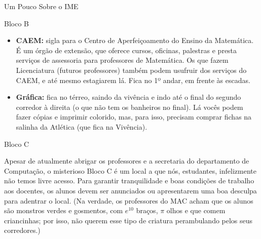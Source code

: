 \begin{secao}{Um Pouco Sobre o IME}
\begin{subsecao}{Bloco B}
\begin{itemize}
Neste ano, a Seção de Alunos nos informou
que o quadro de funcionários está bem reduzido, por isso, pedimos que:
\begin{itemize}
\item[-] Deem preferência ao uso do Sistema JupiterWeb (troquem conversas, ideias e informações com os colegas - um pode ajudar o outro)
\item[-] Evitem encaminhar mensagens por e-mail, pois devido a grande demanda de serviço, o retorno tem sido demorado.
\item[-] Evitem as ligações por telefone, pois a prioridade tem sido o andamento do serviço interno. 
\end{itemize}

\item {\bf CAEM:} sigla para o Centro de Aperfeiçoamento do Ensino da
  Matemática. É um órgão de extensão, que oferece cursos, oficinas, palestras e
  presta serviços de assessoria para professores de Matemática. Os que fazem
  Licenciatura (futuros professores) também podem usufruir dos serviços do CAEM,
  e até mesmo estagiarem lá. Fica no 1º andar, em frente às escadas.

\item{\bf Gráfica:} fica no térreo, saindo da vivência e indo até o final do segundo
  corredor à direita (o que não tem os banheiros no final). Lá vocês podem fazer cópias
  e imprimir colorido, mas, para isso, precisam comprar fichas na salinha da Atlética 
  (que fica na Vivência).
\end{itemize}

\end{subsecao}






\begin{subsecao}{Bloco C}

Apesar de atualmente abrigar os professores e a secretaria do departamento de
Computação, o misterioso Bloco C é um local a que nós, estudantes, infelizmente não
temos livre acesso. Para garantir tranquilidade e boas condições de trabalho aos
docentes, os alunos devem ser anunciados ou apresentarem uma boa desculpa para
adentrar o local. (Na verdade, os professores do MAC acham que os alunos são monstros
verdes e gosmentos, com $e^{10}$ braços, $\pi$ olhos e que comem criancinhas;
por isso, não querem esse tipo de criatura perambulando pelos seus corredores.)


\end{subsecao}
\end{secao}
